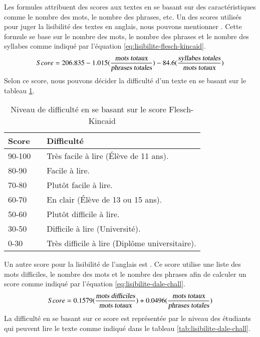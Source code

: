 \documentclass{KodeBook}
\begin{document}
Les formules attribuent des scores aux textes en se basant sur des caractéristiques comme le nombre des mots, le nombre des phrases, etc. 
Un des scores utilisés pour juger la lisibilité des textes en anglais, nous pouvons mentionner . 
Cette formule se base sur le nombre des mots, le nombre des phrases et le nombre des syllabes comme indiqué par l'équation \ref{eq:lisibilite-flesch-kincaid}.
\begin{equation}\label{eq:lisibilite-flesch-kincaid}
Score = 206.835 - 1.015 (\frac{\text{\slshape mots totaux}}{\text{\slshape phrases totales}})
- 84.6 (\frac{\text{\slshape syllabes totales}}{\text{\slshape mots totaux}})
\end{equation}
Selon ce score, nous pouvons décider la difficulté d'un texte en se basant sur le tableau \ref{tab:lisibilite-flesch-kincaid}.

\begin{table}[!ht]
	\centering
	\begin{tabular}{p{}lp{}}
		\hline\hline
		\textbf{Score} && \textbf{Difficulté}\\
		\hline
		90-100 && Très facile à lire (Élève de 11 ans). \\
		80-90 && Facile à lire. \\
		70-80 && Plutôt facile à lire.\\
		60-70 && En clair (Élève de 13 ou 15 ans). \\
		50-60 && Plutôt difficile à lire. \\
		30-50 && Difficile à lire (Université). \\
		0-30 && Très difficile à lire (Diplôme universitaire). \\
		\hline\hline
	\end{tabular}
    \caption{Niveau de difficulté en se basant sur le score Flesch-Kincaid}
    \label{tab:lisibilite-flesch-kincaid}
\end{table}

Un autre score pour la lisibilité de l'anglais est . 
Ce score utilise une liste des mots difficiles, le nombre des mots et le nombre des phrases afin de calculer un score comme indiqué par l'équation \ref{eq:lisibilite-dale-chall}.
\begin{equation}\label{eq:lisibilite-dale-chall}
Score = 0.1579 (\frac{\text{\slshape mots difficiles}}{\text{\slshape mots totaux}})
+ 0.0496 (\frac{\text{\slshape mots totaux}}{\text{\slshape phrases totales}})
\end{equation}
La difficulté en se basant sur ce score est représentée par le niveau des étudiants qui peuvent lire le texte comme indiqué dans le tableau \ref{tab:lisibilite-dale-chall}. 
\end{document}
